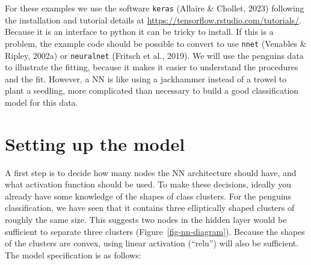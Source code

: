 \documentclass[
  letterpaper,
]{krantz}
\begin{document}
For these examples we use the software \texttt{keras} (Allaire \&
Chollet, 2023) following the installation and tutorial details at
\url{https://tensorflow.rstudio.com/tutorials/}. Because it is an
interface to python it can be tricky to install. If this is a problem,
the example code should be possible to convert to use \texttt{nnet}
(Venables \& Ripley, 2002a) or \texttt{neuralnet} (Fritsch et al.,
2019). We will use the penguins data to illustrate the fitting, because
it makes it easier to understand the procedures and the fit. However, a
NN is like using a jackhammer instead of a trowel to plant a seedling,
more complicated than necessary to build a good classification model for
this data.

\section{Setting up the model}\label{setting-up-the-model}


A first step is to decide how many nodes the NN architecture should
have, and what activation function should be used. To make these
decisions, ideally you already have some knowledge of the shapes of
class clusters. For the penguins classification, we have seen that it
contains three elliptically shaped clusters of roughly the same size.
This suggests two nodes in the hidden layer would be sufficient to
separate three clusters (Figure~\ref{fig-nn-diagram}). Because the
shapes of the clusters are convex, using linear activation (``relu'')
will also be sufficient. The model specification is as follows:
\end{document}
